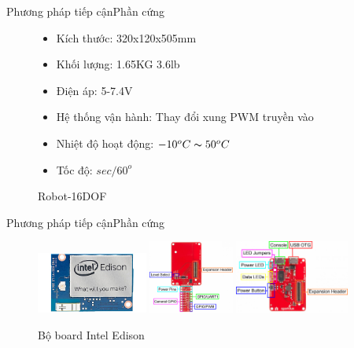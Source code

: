 \documentclass[compress, blue, 13pt,hyperref={pdfpagemode=FullScreen}]{beamer}
\begin{document}
\begin{frame}{Phương pháp tiếp cận}{Phần cứng}
\begin{figure}[hbtp]
\begin{multicols}{2}
\begin{itemize}
\item Kích thước: 320x120x505mm
\item Khối lượng: 1.65KG  3.6lb  
\vspace{0.4cm}
\item Điện áp: 5-7.4V
\item Hệ thống vận hành:  Thay đổi xung PWM truyền vào
\item Nhiệt độ hoạt động: $-10^{o}C\thicksim50^{o}C$
\item Tốc độ: $sec/60^{o}$  %
\end{itemize}
\end{multicols}
\caption{Robot-16DOF}
\end{figure}
\end{frame}
\begin{frame}{Phương pháp tiếp cận}{Phần cứng}
\begin{figure}[hbtp]
\centering
\includegraphics[height = 2cm]{images/MakerBoards-Edison.jpg}
\includegraphics[height = 2.4cm]{images/GPIOBlockAnnotated.png}
\includegraphics[height = 2.4cm]{images/BaseAnnotated.png}
\caption{Bộ board Intel Edison}
\end{figure}
\end{frame}
\end{document}
